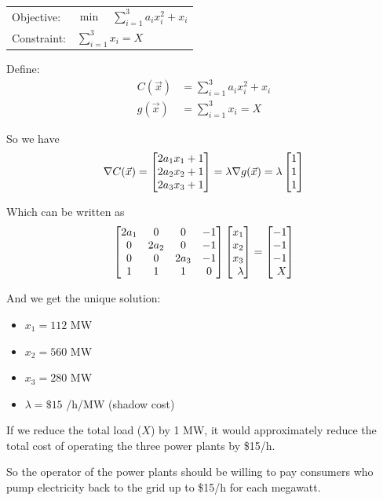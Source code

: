 \documentclass{workbook}
\begin{document}
\begin{solution}
\begin{slide}

\begin{parts}
\setcounter{partsitem}{2}
	\item 	
		\begin{tabular}[t]{ll}
			Objective: 	& $\displaystyle \min \quad \sum_{i=1}^3 a_i x_i^2 + x_i$ \\
			Constraint: & $\displaystyle \sum_{i=1}^3 x_i = X$
		\end{tabular}

	\item Define:
		\begin{align*}
			C(\vec{x}) & = \sum_{i=1}^3 a_i x_i^2 + x_i \\
			g(\vec{x}) & = \sum_{i=1}^3 x_i = X
		\end{align*}
		
		So we have
		\[
			\nabla C (\vec{x}) 
				= \mat{2a_1 x_1 + 1\\2a_2 x_2 + 1\\2a_3 x_3 + 1} 
				= \lambda	\nabla g (\vec{x}) 
				= \lambda \mat{1\\1\\1}
		\]
		
		Which can be written as
		\[ \matc{2a_1 & 0 & 0 & -1\\0 & 2a_2 & 0 & -1\\0 & 0 & 2a_3 & -1 \\ 1 & 1 & 1 & 0} \mat{x_1\\x_2\\x_3\\\lambda} = \mat{-1\\-1\\-1\\ X}
		\]
		
		And we get the unique solution:
		\begin{itemize}
			\item $x_1 = 112$ MW
			\item $x_2 = 560$ MW
			\item $x_3 = 280$ MW
			\item $\lambda = \$15$ /h/MW (shadow cost)
		\end{itemize}
		
		\item If we reduce the total load ($X$) by 1 MW, it would approximately reduce the total cost of operating the three power plants by \$15/h.
		
		So the operator of the power plants should be willing to pay consumers who pump electricity back to the grid up to \$15/h for each megawatt.


\end{parts}
\end{slide}
\end{solution}
\end{document}
